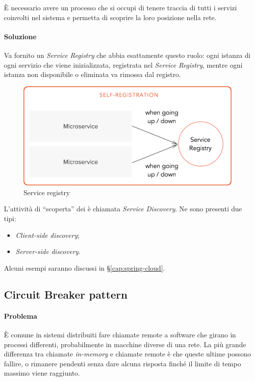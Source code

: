 È necessario avere un processo che si occupi di tenere traccia di tutti i servizi coinvolti nel sistema e permetta di scoprire la loro posizione nella rete.

\paragraph*{Soluzione} Va fornito un \textit{Service Registry} che abbia esattamente questo ruolo:
ogni istanza di ogni servizio che viene inizializzata, registrata nel \textit{Service Registry}, mentre ogni istanza non disponibile o eliminata va rimossa dal registro.

\begin{figure}[H]
	\centering
	\includegraphics[width=\textwidth]{immagini/service-registry.png}
	\caption[Service Registry]{Service registry\footnotemark}
\end{figure}

L'attività di ``scoperta'' dei  è chiamata \textit{Service Discovery}. Ne sono presenti due tipi:
\begin{itemize}
	\item \textit{Client-side discovery};
	\item \textit{Server-side discovery}.
\end{itemize}
Alcuni esempi saranno discussi in \S\ref{cap:spring-cloud}.


\subsection{Circuit Breaker pattern}\label{circuit-breaker}

\paragraph*{Problema} È comune in sistemi distribuiti fare chiamate remote a software che girano in processi differenti, probabilmente in macchine diverse di una rete.
La più grande differenza tra chiamate \textit{in-memory} e chiamate remote è che queste ultime possono fallire, o rimanere pendenti senza dare alcuna risposta finché il limite di tempo massimo viene raggiunto.

